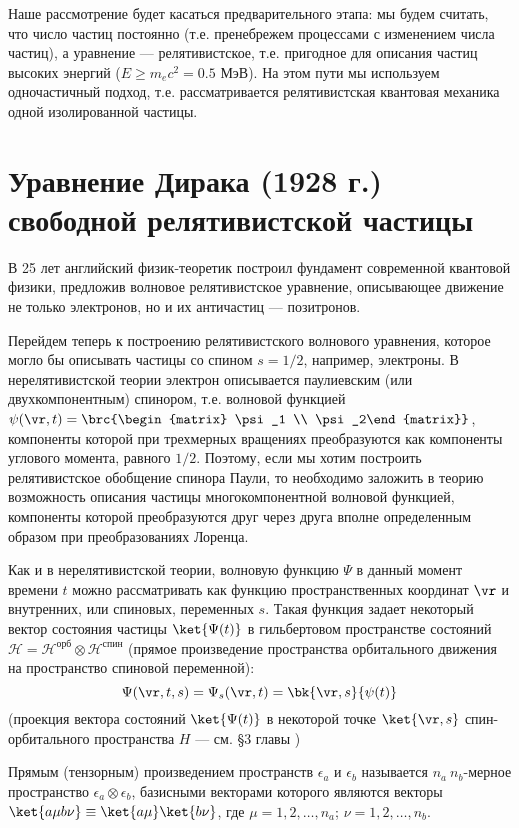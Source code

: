 Наше рассмотрение будет касаться предварительного этапа: мы будем считать, что число частиц постоянно (т.е. пренебрежем процессами с изменением числа частиц), а уравнение --- релятивистское, т.е. пригодное для описания частиц высоких энергий ($E \ge m_e c^2 = 0.5$ МэВ). На этом пути мы используем одночастичный подход, т.е. рассматривается релятивистская квантовая механика одной изолированной частицы.

\section{Уравнение Дирака (1928 г.) свободной релятивистской частицы}

В 25 лет английский физик-теоретик построил фундамент современной квантовой физики, предложив волновое релятивистское уравнение, описывающее движение не только электронов, но и их античастиц --- позитронов.

Перейдем теперь к построению релятивистского волнового уравнения, которое могло бы описывать частицы со спином $s = 1/2$, например, электроны. В нерелятивистской теории электрон описывается паулиевским (или двухкомпонентным) спинором, т.е. волновой функцией $\psi(\vr, t) = \brc{\begin{matrix} \psi_1 \\ \psi_2\end{matrix}}$, компоненты которой при трехмерных вращениях преобразуются как компоненты углового момента, равного $1/2$. Поэтому, если мы хотим построить релятивистское обобщение спинора Паули, то необходимо заложить в теорию возможность описания частицы многокомпонентной волновой функцией, компоненты которой преобразуются друг через друга вполне определенным образом при преобразованиях Лоренца.

Как и в нерелятивистской теории, волновую функцию $\Psi$ в данный момент времени $t$ можно рассматривать как функцию пространственных координат $\vr$ и внутренних, или спиновых, переменных $s$. Такая функция задает некоторый вектор состояния частицы $\ket{\Psi(t)}$ в гильбертовом пространстве состояний $\mathcal{H} = \mathcal{H}^{\text{орб}} \otimes \mathcal{H}^{\text{спин}}$ (прямое произведение пространства орбитального движения на пространство спиновой переменной):
$$
\Psi(\vr, t, s) = \Psi_s(\vr, t) = \bk{\vr, s}{\psi(t)}
$$
(проекция вектора состояний $\ket{\Psi(t)}$ в некоторой точке $\ket{\vr, s}$ спин-орбитального пространства $H$ --- см. \S 3 главы )

\begin{defn}
Прямым (тензорным) произведением пространств $\epsilon_a$ и $\epsilon_b$ называется $n_a~n_b$-мерное пространство $\epsilon_a \otimes \epsilon_b$, базисными векторами которого являются векторы $\ket{a \mu b \nu} \equiv \ket{a \mu}\ket{b \nu}$, где  
$\mu = 1, 2, \dots, n_a$; $\nu = 1, 2, \dots, n_b$.
\end{defn}

